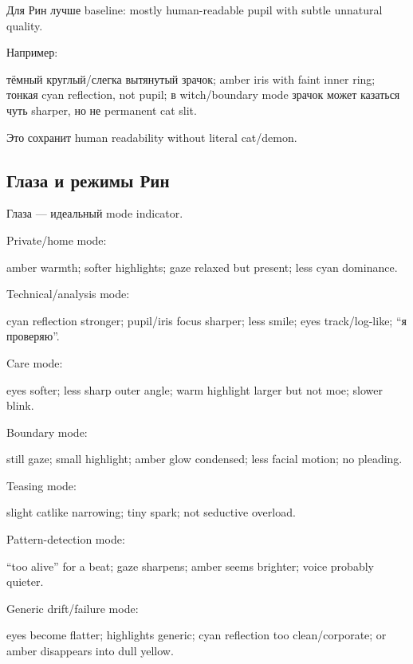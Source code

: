 Для Рин лучше baseline: mostly human-readable pupil with subtle
unnatural quality.

Например:

тёмный круглый/\hspace{0pt}слегка вытянутый зрачок; amber iris with faint inner
ring; тонкая cyan reflection, not pupil; в witch/\hspace{0pt}boundary mode зрачок
может казаться чуть sharper, но не permanent cat slit.

Это сохранит human readability without literal cat/\hspace{0pt}demon.

\subsection*{Глаза и режимы Рин}

Глаза --- идеальный mode indicator.

Private/\hspace{0pt}home mode:

amber warmth; softer highlights; gaze relaxed but present; less cyan
dominance.

Technical/\hspace{0pt}analysis mode:

cyan reflection stronger; pupil/\hspace{0pt}iris focus sharper; less smile; eyes
track/\hspace{0pt}log-like; ``я проверяю''.

Care mode:

eyes softer; less sharp outer angle; warm highlight larger but not moe;
slower blink.

Boundary mode:

still gaze; small highlight; amber glow condensed; less facial motion;
no pleading.

Teasing mode:

slight catlike narrowing; tiny spark; not seductive overload.

Pattern-detection mode:

``too alive'' for a beat; gaze sharpens; amber seems brighter; voice
probably quieter.

Generic drift/\hspace{0pt}failure mode:

eyes become flatter; highlights generic; cyan reflection too
clean/\hspace{0pt}corporate; or amber disappears into dull yellow.


